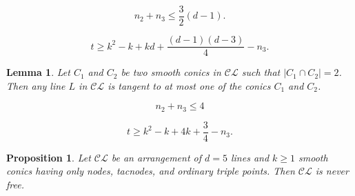 \documentclass[10pt,a4paper]{amsart}
\newtheorem{prop}{Proposition}
\newtheorem{lem}{Lemma}
\begin{document}
\begin{equation}
\label{E7"}
n_2+n_3 \leq \frac{3}{2}(d-1).
\end{equation}

\begin{equation}
\label{E7'}
t \geq k^2 - k + kd +\frac{(d-1)(d-3)}{4}-n_3.
\end{equation}

\begin{lem}
\label{lem16}
Let $C_1$ and $C_2$ be two smooth conics in $\mathcal{CL}$ such that 
$|C_1 \cap C_2|=2$. Then any line $L$ in $\mathcal{CL}$ is tangent to at most one of the conics $C_1$ and $C_2$.
\end{lem}

\begin{equation}
\label{E11a}
n_2+ n_3 \leq 4
\end{equation}

\begin{equation}
\label{E11b}
t \geq k^2-k+4k + \frac{3}{4} - n_3.
\end{equation}

\begin{prop}
\label{prop11b}
Let $\mathcal{CL}$ be an arrangement of $d=5$ lines and $k \geq 1$ smooth conics having only nodes, tacnodes, and ordinary triple points. Then $\mathcal{CL}$  is never free.
\end{prop}
\end{document}
